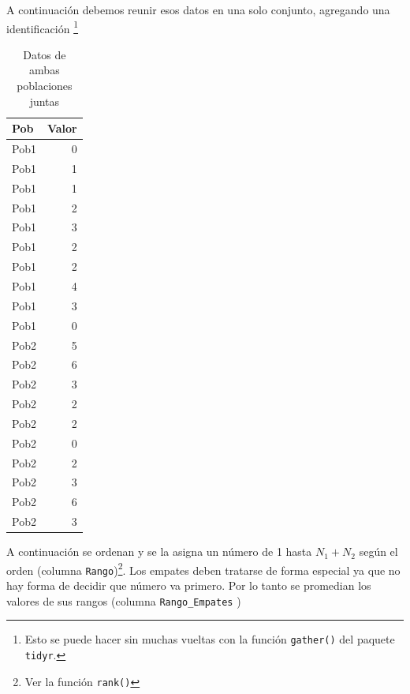 \documentclass[]{book}
\newenvironment{Shaded}{\begin{snugshade}}{\end{snugshade}}
\newcommand{\DataTypeTok}[1]{\textcolor[rgb]{0.13,0.29,0.53}{#1}}
\newcommand{\KeywordTok}[1]{\textcolor[rgb]{0.13,0.29,0.53}{\textbf{#1}}}
\newcommand{\NormalTok}[1]{#1}
\newcommand{\OperatorTok}[1]{\textcolor[rgb]{0.81,0.36,0.00}{\textbf{#1}}}
\newcommand{\StringTok}[1]{\textcolor[rgb]{0.31,0.60,0.02}{#1}}
\let\rmarkdownfootnote\footnote%
\def\footnote{\protect\rmarkdownfootnote}
\theoremstyle{definition}
\theoremstyle{definition}
\theoremstyle{definition}
\theoremstyle{remark}
\begin{document}
A continuación debemos reunir esos datos en una solo conjunto, agregando
una identificación \footnote{Esto se puede hacer sin muchas vueltas con
  la función \texttt{gather()} del paquete \texttt{tidyr}.}

\begin{table}

\caption{\label{tab:ejemplo-ranking-gather}Datos de ambas poblaciones juntas}
\centering
\begin{tabular}[t]{l|r}
\hline
Pob & Valor\\
\hline
Pob1 & 0\\
\hline
Pob1 & 1\\
\hline
Pob1 & 1\\
\hline
Pob1 & 2\\
\hline
Pob1 & 3\\
\hline
Pob1 & 2\\
\hline
Pob1 & 2\\
\hline
Pob1 & 4\\
\hline
Pob1 & 3\\
\hline
Pob1 & 0\\
\hline
Pob2 & 5\\
\hline
Pob2 & 6\\
\hline
Pob2 & 3\\
\hline
Pob2 & 2\\
\hline
Pob2 & 2\\
\hline
Pob2 & 0\\
\hline
Pob2 & 2\\
\hline
Pob2 & 3\\
\hline
Pob2 & 6\\
\hline
Pob2 & 3\\
\hline
\end{tabular}
\end{table}

A continuación se ordenan y se la asigna un número de 1 hasta
\(N_1+N_2\) según el orden (columna \texttt{Rango})\footnote{Ver la
  función \texttt{rank()}}. Los empates deben tratarse de forma especial
ya que no hay forma de decidir que número va primero. Por lo tanto se
promedian los valores de sus rangos (columna \texttt{Rango\_Empates} )

\begin{Shaded}
\end{Shaded}
\end{document}
